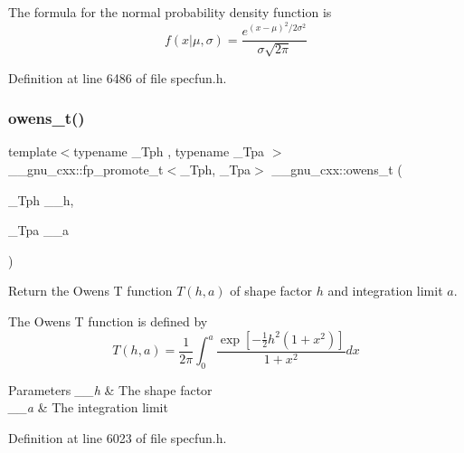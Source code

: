 The formula for the normal probability density function is \[ f(x|\mu,\sigma) = \frac{e^{(x-\mu)^2/2\sigma^2}}{\sigma\sqrt{2\pi}} \] 

Definition at line 6486 of file specfun.\+h.

\mbox{\label{group__gnu__math__spec__func_gab4e367aae19853cca3af99eead01fcaa}} 
\subsubsection{\texorpdfstring{owens\+\_\+t()}{owens\_t()}}
{\footnotesize\ttfamily template$<$typename \+\_\+\+Tph , typename \+\_\+\+Tpa $>$ \\
\+\_\+\+\_\+gnu\+\_\+cxx\+::fp\+\_\+promote\+\_\+t$<$\+\_\+\+Tph, \+\_\+\+Tpa$>$ \+\_\+\+\_\+gnu\+\_\+cxx\+::owens\+\_\+t (\begin{DoxyParamCaption}\item[{\+\_\+\+Tph}]{\+\_\+\+\_\+h,  }\item[{\+\_\+\+Tpa}]{\+\_\+\+\_\+a }\end{DoxyParamCaption})\hspace{0.3cm}{\ttfamily [inline]}}

Return the Owens T function $ T(h,a) $ of shape factor $ h $ and integration limit $ a $.

The Owens T function is defined by \[ T(h,a) = \frac{1}{2\pi}\int_0^a \frac{\exp\left[-\frac{1}{2}h^2(1+x^2)\right]}{1+x^2} dx \]


\begin{DoxyParams}{Parameters}
{\em \+\_\+\+\_\+h} & The shape factor \\
\hline
{\em \+\_\+\+\_\+a} & The integration limit \\
\hline
\end{DoxyParams}


Definition at line 6023 of file specfun.\+h.

\mbox{\label{group__gnu__math__spec__func_gac24d32e9b072c4953654d5559f992871}} 
